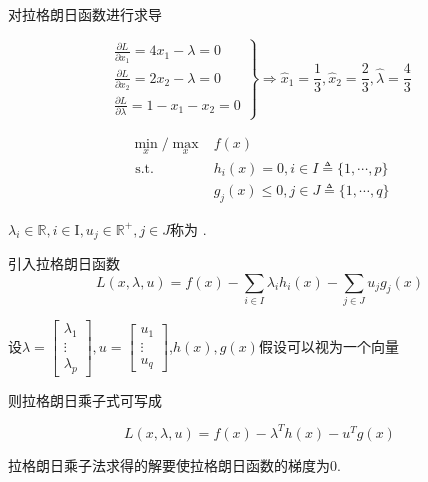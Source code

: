 对拉格朗日函数进行求导

\begin{equation} \left.\begin{array}{l}\frac{\partial L}{\partial x_{1}}=4 x_{1}-\lambda=0 \\ \frac{\partial L}{\partial x_{2}}=2 x_{2}-\lambda=0 \\ \frac{\partial L}{\partial \lambda}=1-x_{1}-x_{2}=0\end{array}\right \} \Rightarrow \hat{x}_{1}=\frac{1}{3}, \hat{x}_{2}=\frac{2}{3}, \hat{\lambda}=\frac{4}{3} \end{equation}

\begin{definition}
    \begin{equation}\begin{aligned}
        \min _{x} / \max_{x}& f(x) \\
\text{ s.t. } & h_{i}(x)=0, i \in I \triangleq\{1, \cdots, p\} \\
&g_{j}(x) \leq 0, j \in J \triangleq\{1, \cdots, q\}
    \end{aligned}\end{equation}

$ \lambda_{i} \in \mathbb{R}, i \in \mathrm{I}, u_{j} \in \mathbb{R}^{+}, j \in J $称为 .

引入拉格朗日函数 \begin{equation} L(x, \lambda, u)=f(x)-\sum_{i \in I} \lambda_{i} h_{i}(x)-\sum_{j \in J} u_{j} g_{j}(x)   \end{equation}

设$\lambda=\left[\begin{array}{c}\lambda_{1} \\ \vdots \\ \lambda_{p}\end{array}\right], u=\left[\begin{array}{c}u_{1} \\ \vdots \\ u_{q}\end{array}\right]$,$h(x),g(x)$假设可以视为一个向量

则拉格朗日乘子式可写成


\begin{equation} L(x, \lambda, u)=f(x) - \lambda^T h(x) - u^T g(x)\end{equation}

拉格朗日乘子法求得的解要使拉格朗日函数的梯度为0.

\end{definition}

